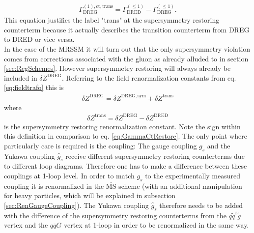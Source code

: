 \begin{align}
\Gamma^{\mathrm{(1),ct,trans}}_{\mathrm{DREG}} = \Gamma^{(\leq 1)}_{\mathrm{DRED}} - \Gamma^{(\leq 1)}_{\mathrm{DREG}}.\label{eq:GammaCtRestore}
\end{align} 
This equation justifies the label "trans" at the supersymmetry restoring counterterm because it actually describes the transition counterterm from DREG to DRED or vice versa.\\ %
In the case of the MRSSM it will turn out that the only supersymmetry violation comes from corrections associated with the gluon as already alluded to in section \ref{sec:RegSchemes}. However supersymmetry restoring will always already be included in $\delta Z^{\mathrm{DREG}}$. Referring to the field renormalization constants from eq. \ref{eq:fieldtrafo} this is 
\begin{align}
\delta Z^{\mathrm{DREG}} = \delta Z^{\mathrm{DREG,sym}} + \delta Z^{\mathrm{trans}}
\end{align}
where 
\begin{align}
\delta Z^{\mathrm{trans}} = \delta Z^{\mathrm{DREG}} - \delta Z^{\mathrm{DRED}}
\end{align}
is the supersymmetry restoring renormalization constant. Note the sign within this definition in comparison to eq. \ref{eq:GammaCtRestore}. The only point where particularly care is required is the coupling: The  gauge coupling $g_s$ and the Yukawa coupling $\hat{g}_s$ receive different supersymmetry restoring counterterms due to different loop diagrams. Therefore one has to make a difference between these couplings at 1-loop level. In order to match $g_s$ to the experimentally measured coupling it is renormalized in the  $\overline{\mathrm{MS}}$-scheme (with an additional manipulation for heavy particles, which will be explained in subsection \ref{sec:RenGaugeCoupling}). The Yukawa coupling $\hat{g}_s$ therefore needs to be added with the difference of the supersymmetry restoring counterterms from the $q\tilde{q}^\dagger\tilde{g}$ vertex and the $q\overline{q}G$ vertex at 1-loop in order to be renormalized in the same way.




